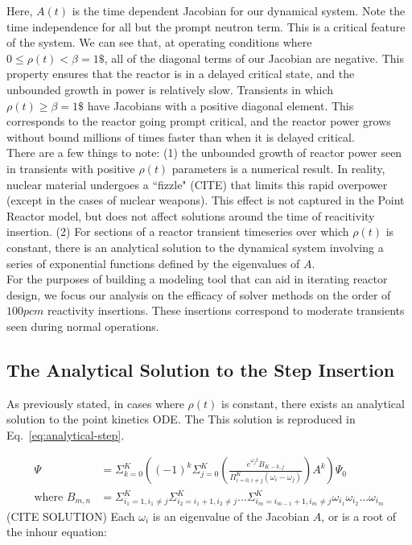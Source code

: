 \documentclass[review,onefignum,onetabnum]{siamart171218}
\begin{document}
Here, $A(t)$ is the time dependent Jacobian for our dynamical system. Note the
time independence for all but the prompt neutron term. This is a critical feature
of the system. We can see that, at operating conditions where $0 \leq \rho(t) < \beta = 1\$$,
all of the diagonal terms of our Jacobian are negative. This property ensures
that the reactor is in a delayed critical state, and the unbounded growth in power
is relatively slow. Transients in which $\rho(t) \geq \beta = 1\$$ have Jacobians with
a positive diagonal element. This corresponds to the reactor going prompt critical, and
the reactor power grows without bound millions of times faster than when it is delayed
critical. \\

There are a few things to note: (1) the unbounded growth of reactor power seen
in transients with positive $\rho(t)$ parameters is a numerical result. In reality,
nuclear material undergoes a ``fizzle" (CITE) that limits this rapid overpower (except
in the cases of nuclear weapons). This effect is not captured in the Point Reactor
model, but does not affect solutions around the time of reacitivity insertion. (2) For
sections of a reactor transient timeseries over which $\rho(t)$ is constant, there is an
analytical solution to the dynamical system involving a series of exponential functions
defined by the eigenvalues of $A$. \\

For the purposes of building a modeling tool that can aid in iterating reactor design,
we focus our analysis on the efficacy of solver methods on the order of $100 pcm$
reactivity insertions. These insertions correspond to moderate transients seen during
normal operations.

\subsection{The Analytical Solution to the Step Insertion}
As previously stated, in cases where $\rho(t)$ is constant, there exists an
analytical solution to the point kinetics ODE. The  This solution is reproduced in
Eq.~\cref{eq:analytical-step}.

\begin{align}
  \label{eq:analytical-step}
  \Psi &= \Sigma_{k=0}^K \left( (-1)^k \Sigma_{j=0}^K \left( \frac{e^{\omega_jt}B_{K-k,j}}{\Pi_{i=0, i\neq j}^K (\omega_i - \omega_j)}\right) A^k\right)\Psi_0\\
  \text{where } B_{m,n} &= \Sigma_{i_1 = 1, i_1 \neq j}^K \Sigma_{i_2 = i_1 + 1, i_2 \neq j}^K ...\Sigma_{i_m = i_{m-1} + 1, i_m \neq j}^K \omega_{i_1}\omega_{i_2}...\omega_{i_m}
\end{align}
(CITE SOLUTION)
Each $\omega_i$ is an eigenvalue of the Jacobian $A$, or is a root of the inhour
equation:
\end{document}
